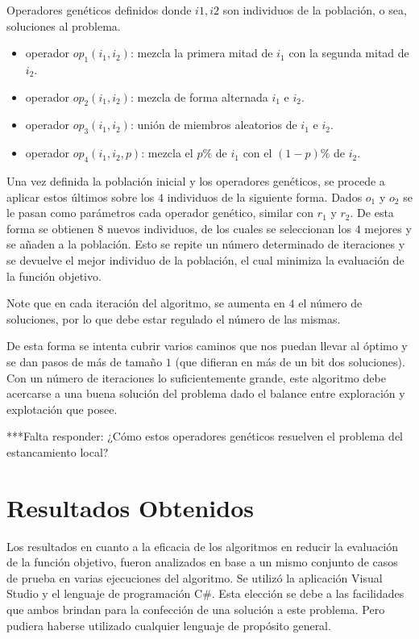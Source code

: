 \documentclass[a4paper,12pt]{book}
\begin{document}
		Operadores genéticos definidos donde $i1, i2$ son individuos de la población, o sea, soluciones al problema.
		
			\begin{itemize}
			\item operador $op_1(i_1, i_2)$: mezcla la primera mitad de $i_1$ con la segunda mitad de $i_2$.
			\item operador $op_2(i_1, i_2)$: mezcla de forma alternada $i_1$ e $i_2$.
			\item operador $op_3(i_1, i_2)$: unión de miembros aleatorios de $i_1$ e $i_2$.
			\item operador $op_4(i_1, i_2, p)$: mezcla el $p\%$ de $i_1$ con el $(1-p)\%$ de $i_2$.
		\end{itemize}
	
		Una vez definida la población inicial y los operadores genéticos, se procede a aplicar estos últimos sobre los $4$ individuos de la siguiente forma. Dados $o_1$ y $o_2$ se le pasan como parámetros cada operador genético, similar con $r_1$ y $r_2$. De esta forma se obtienen $8$ nuevos individuos, de los cuales se seleccionan los $4$ mejores y se añaden a la población. Esto se repite un número determinado de iteraciones y se devuelve el mejor individuo de la población, el cual minimiza la evaluación de la función objetivo.
		
		Note que en cada iteración del algoritmo, se aumenta en $4$ el número de soluciones, por lo que debe estar regulado el número de las mismas.
	
		De esta forma se intenta cubrir varios caminos que nos puedan llevar al óptimo y se dan pasos de más de tamaño $1$ (que difieran en más de un bit dos soluciones). Con un número de iteraciones lo suficientemente grande, este algoritmo debe acercarse a una buena solución del problema dado el balance entre exploración y explotación que posee.
		
		***Falta responder: ¿Cómo estos operadores genéticos resuelven el problema del estancamiento local?
	
\chapter{Resultados Obtenidos}

	Los resultados en cuanto a la eficacia de los algoritmos en reducir la evaluación de la función objetivo, fueron analizados en base a un mismo conjunto de casos de prueba en varias ejecuciones del algoritmo. Se utilizó la aplicación Visual Studio y el lenguaje de programación C\#. Esta elección se debe a las facilidades que ambos brindan para la confección de una solución a este problema. Pero pudiera haberse utilizado cualquier lenguaje de propósito general. 
	
\end{document}
